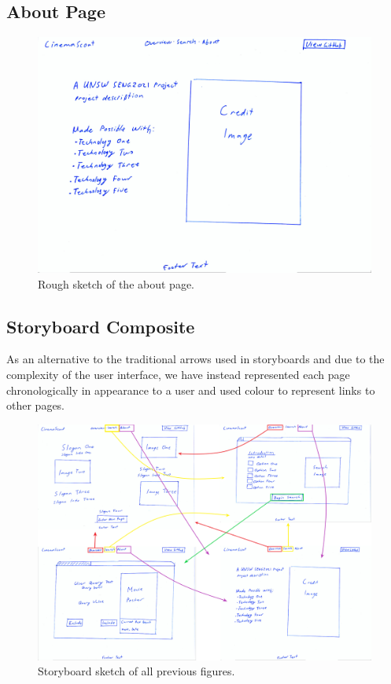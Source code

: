 \documentclass{article}
\begin{document}
\subsection{About Page}
\begin{figure}[H]
\includegraphics[width=\columnwidth]{res/credits.jpg}
\caption{Rough sketch of the about page.}
\end{figure}
\subsection{Storyboard Composite}
As an alternative to the traditional arrows used in storyboards and due to the
complexity of the user interface, we have instead represented each page
chronologically in appearance to a user and used colour to represent links
to other pages.
\begin{figure}[H]
\includegraphics[width=\columnwidth]{res/arrows_new.png}
\caption{Storyboard sketch of all previous figures.}
\end{figure}
\end{document}

